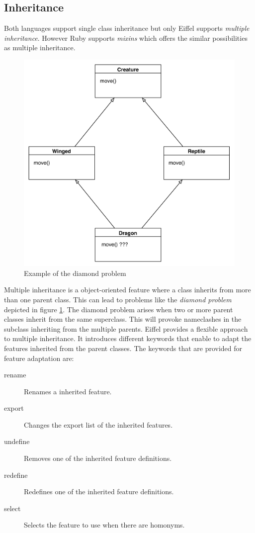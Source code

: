 \documentclass[12pt,a4paper,twocolumn]{article}
\begin{document}
\subsection{Inheritance}
Both languages support single class inheritance but only Eiffel supports \emph{multiple inheritance}. However Ruby supports \emph{mixins} which offers the similar possibilities as multiple inheritance.
\begin{figure}[H]
\centering
\includegraphics[scale=0.4]{diamond.pdf}
\caption{Example of the diamond problem}
\label{fig:diamond}
\end{figure}
Multiple inheritance is a object-oriented feature where a class inherits from more than one parent class. This can lead to problems like the \emph{diamond problem} depicted in figure \ref{fig:diamond}. The diamond problem arises when two or more parent classes inherit from the same superclass. This will provoke nameclashes in the subclass inheriting from the multiple parents. Eiffel provides a flexible approach to multiple inheritance. It introduces different keywords that enable to adapt the features inherited from the parent classes. The keywords that are provided for feature adaptation are:
\begin{description}
\item[rename] Renames a inherited feature.
\item[export] Changes the export list of the inherited features.
\item[undefine] Removes one of the inherited feature definitions.
\item[redefine] Redefines one of the inherited feature definitions.
\item[select] Selects the feature to use when there are homonyms.
\end{description}
\end{document}
